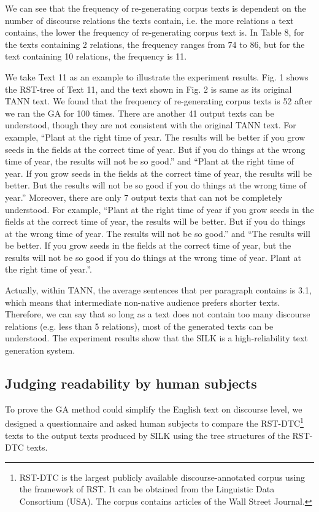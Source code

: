 \documentclass[english]{jnlp_1.2.0}
\begin{document}
We can see that the frequency of re-generating corpus texts 
is dependent on the number of discourse relations the texts contain,
i.e. the more relations a text contains, the lower the 
frequency of re-generating corpus text is. In Table 8, for the
texts containing 2 relations, the frequency ranges from 74 to 86, 
but for the text containing 10 relations, the frequency is 11. 

We take Text 11 as an example to illustrate the experiment results. 
Fig. 1 shows the RST-tree of Text 11, and the text shown in 
Fig. 2 is same as its original TANN text. We found that the 
frequency of re-generating corpus texts is 52 after we ran the GA for
100 times. There are another 41 output texts can be understood,
though they are not consistent with 
the original TANN text. For example, ``Plant at the right time of year. 
The results will be better if you grow seeds in the fields 
at the correct time of year. But if you do things at the wrong 
time of year, the results will not be so good.'' and ``Plant at the right 
time of year. If you grow seeds in the fields at the
correct time of year, the results will be better. But 
the results will not be so good if you do things at the wrong 
time of year.'' Moreover, there are only 7 output texts 
that can not be completely understood. For example, 
``Plant at the right time of year if you grow seeds 
in the fields at the correct time of year, the results will be better. But if 
you do things at the wrong time of year. The results will not 
be so good.'' and ``The results will be better. If you grow 
seeds in the fields at the correct time of year, but 
the results will not be so good if you do things at the wrong 
time of year. Plant at the right time of year.''.

Actually, within TANN, the average sentences that per paragraph 
contains is 3.1, which means that intermediate non-native audience
prefers shorter texts. Therefore, we can say that so long as a text 
does not contain too many discourse relations (e.g. less than 5 relations), 
most of the generated texts can be understood. The experiment results
show that the SILK is a high-reliability text generation system. 

\subsection{Judging readability by human subjects}

To prove the GA method could simplify the English
text on discourse level, we designed a questionnaire
and asked human subjects to compare the RST-DTC\footnote{RST-DTC is the largest publicly available discourse-annotated corpus using the framework of RST. It can be obtained from the Linguistic Data Consortium (USA). The corpus contains articles of the Wall Street Journal.} texts to the output texts produced by SILK using the tree structures of 
the RST-DTC texts. 
\end{document}

